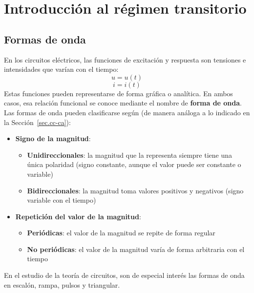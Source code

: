 \chapter{Introducción al régimen transitorio}
	
	\section{Formas de onda}
	
	En los circuitos eléctricos, las funciones de excitación y respuesta son tensiones
	e intensidades que varían con el tiempo:
	\begin{equation*}
		u=u(t)
	\end{equation*}
	\begin{equation*}
		i=i(t)
	\end{equation*}
	Estas funciones pueden representarse de forma gráfica o analítica. En ambos
	casos, esa relación funcional se conoce mediante el nombre de \textbf{forma de onda}. Las formas de onda pueden clasificarse según (de manera análoga a lo indicado en la Sección~\ref{sec.cc-ca}):
	\begin{itemize}
		\item \textbf{Signo de la magnitud}:
		\begin{itemize}
			\item \textbf{Unidireccionales}: la magnitud que la representa siempre tiene una única polaridad (signo constante, aunque el valor puede ser constante o variable)
			\item \textbf{Bidireccionales}: la magnitud toma valores positivos y negativos (signo variable con el tiempo)
		\end{itemize}
		\item \textbf{Repetición del valor de la magnitud}:
		\begin{itemize}
			\item \textbf{Periódicas}: el valor de la magnitud se repite de forma regular
			\item \textbf{No periódicas}: el valor de la magnitud varía de forma arbitraria con el tiempo
		\end{itemize}
	\end{itemize}
	
	En el estudio de la teoría de circuitos, son de especial interés las formas de onda en escalón, rampa, pulsos y triangular.
	
